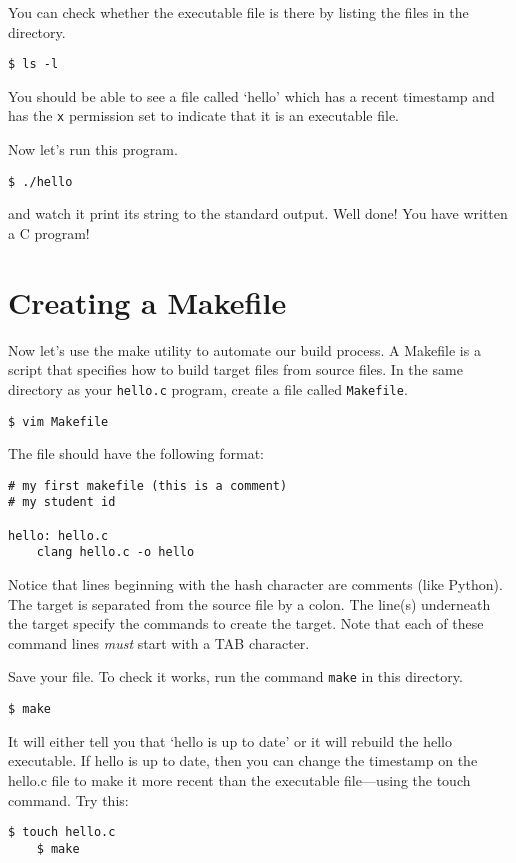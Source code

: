 \documentclass{article}
\begin{document}
You can check whether the executable file is there by listing the files in the directory.
\begin{lstlisting}[style=BashInputStyle]
    $ ls -l 
\end{lstlisting}
You should be able to see a file called `hello' which has a recent timestamp and has the \texttt{x} permission set to indicate that it is an executable file.

Now let's run this program. 
\begin{lstlisting}[style=BashInputStyle]
    $ ./hello
\end{lstlisting}
and watch it print its string to the standard output. Well done! You have written a C program!



\section*{Creating a Makefile}

Now let's use the make utility to automate our build process. A Makefile is a script that specifies how to build target files from source files.
In the same directory as your \texttt{hello.c} program, create a file called \texttt{Makefile}.
\begin{lstlisting}[style=BashInputStyle]
    $ vim Makefile
\end{lstlisting}

The file should have the following format:
\begin{lstlisting}[style=MakeProg]
# my first makefile (this is a comment)
# my student id 

hello: hello.c
    clang hello.c -o hello
\end{lstlisting}

Notice that lines beginning with the hash character are comments (like Python).
The target is separated from the source file by a colon. 
The line(s) underneath the target specify the commands to create the target. Note that each of these command lines \textit{must} start with a TAB character.

Save your file. To check it works, run the command \texttt{make} in this directory.
\begin{lstlisting}[style=BashInputStyle]
    $ make
\end{lstlisting}

It will either tell you that `hello is up to date' or it will rebuild the hello executable. If hello is up to date, then you can change the timestamp on the hello.c file to make it more recent than the executable file---using the touch command. Try this:
\begin{lstlisting}[style=BashInputStyle]
    $ touch hello.c
    $ make
\end{lstlisting}
\end{document}
